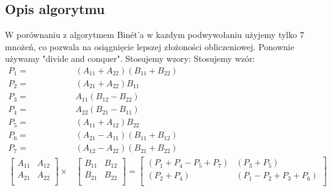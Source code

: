 \documentclass[12pt,a4paper,table]{article}
\begin{document}
    \subsection{Opis algorytmu}
    W porównaniu z algorytmem Binét'a w kazdym podwywołaniu użyjemy tylko
    7 mnożeń, co pozwala na osiągnięcie lepszej złożoności obliczeniowej.
    Ponownie używamy "divide and conquer". Stosujemy wzory:
    Stosujemy wzór:
    \begin{align*}
    P_{1} =& (A_{11} + A_{22})(B_{11} + B_{22}) \\
    P_{2} =& (A_{21} + A_{22})B_{11} \\
    P_{3} =& A_{11}(B_{12} - B_{22}) \\
    P_{4} =& A_{22}(B_{21} - B_{11}) \\
    P_{5} =& (A_{11} + A_{12})B_{22} \\
    P_{6} =& (A_{21} - A_{11})(B_{11} + B_{12}) \\
    P_{7} =& (A_{12} - A_{22})(B_{21} + B_{22}) \\
    \begin{bmatrix}
        A_{11} & A_{12} \\
        A_{21} & A_{22} \\ 
    \end{bmatrix}
    \times &
    \begin{bmatrix}
        B_{11} & B_{12} \\
        B_{21} & B_{22} \\ 
    \end{bmatrix}
    =
    \begin{bmatrix}
        (P_{1} + P_{4} - P_{5} + P_{7}) & (P_{3} + P_{5}) \\
        (P_{2} + P_{4}) & (P_{1} - P_{2} + P_{3} + P_{6}) \\ 
    \end{bmatrix}
    \end{align*}
    
\end{document}
